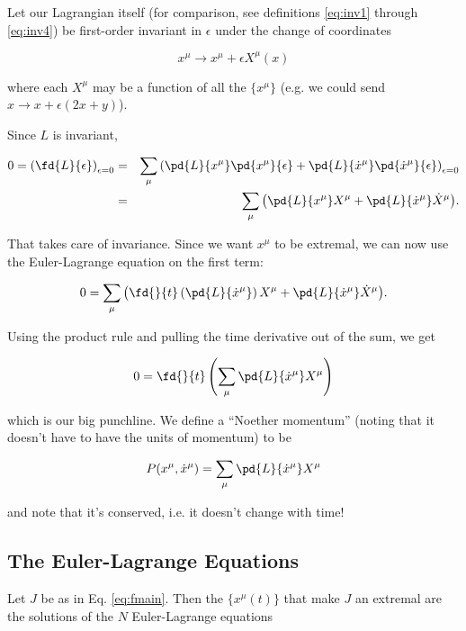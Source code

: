 \documentclass[12pt]{article}
\newcommand{\coord}{x}
\newcommand{\Coord}{X}
\newcommand{\xd}{\dot{\coord}}
\newcommand{\Xd}{\dot{\Coord}}
\newcommand{\xmu}{\coord^\mu}
\newcommand{\Xmu}{\Coord^\mu}
\newcommand{\Xdmu}{\Xd^\mu}
\newcommand{\xdmu}{\xd^\mu}
\numberwithin{equation}{section}
\begin{document}
Let our Lagrangian itself (for comparison, see definitions
\ref{eq:inv1} through \ref{eq:inv4}) be first-order invariant in
$\epsilon$ under the change of coordinates

\begin{equation}
  \xmu \to \xmu + \epsilon\Xmu(\coord) 
\end{equation}

where each $\Xmu$ may be a function of all the $\{\xmu\}$ (e.g. we
could send $x \to x + \epsilon(2x+y)$).

Since $L$ is invariant,

\begin{eqnarray}
  0 = \left( \fd{L}{\epsilon}\right)_{\epsilon=0} 
  &=& \sum_\mu{\left( \pd{L}{\xmu}\pd{\xmu}{\epsilon} +  \pd{L}{\xdmu}\pd{\xdmu}{\epsilon} \right)_{\epsilon=0}} \\
  &=&\sum_\mu{\left( \pd{L}{\xmu}\Xmu +  \pd{L}{\xdmu}\Xdmu \right)}.\notag
\end{eqnarray}

That takes care of invariance. Since we want $\xmu$ to be extremal, we
can now use the Euler-Lagrange equation on the first term:

\begin{equation}
0 = \sum_\mu{\left( \fd{}{t}\left(\pd{L}{\xdmu}\right)\Xmu +  \pd{L}{\xdmu}\Xdmu \right)}.
\end{equation}

Using the product rule and pulling the time derivative out of the sum,
we get

\begin{equation}
  0 = \fd{}{t}\left( \sum_\mu{\pd{L}{\xdmu}\Xmu} \right)
\end{equation}

which is our big punchline. We define a ``Noether momentum'' (noting
that it doesn't have to have the units of momentum) to be

\begin{equation}
  P(\xmu,\xdmu) = \sum_\mu{\pd{L}{\xdmu}\Xmu}
\end{equation}

and note that it's conserved, i.e. it doesn't change with time!



\subsection{The Euler-Lagrange Equations}
Let $J$ be as in Eq. \ref{eq:fmain}. Then the $\{\xmu(t)\}$ that make $J$ an
extremal are the solutions of the $N$ Euler-Lagrange equations
\end{document}
